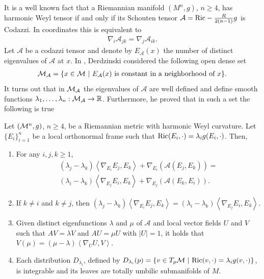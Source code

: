 It is a well known fact that a Riemannian manifold $(M^{n},g)$, $n\geq4$, has harmonic Weyl tensor if and only if its Schouten tensor $\mathcal{A}=\mathrm{Ric}-\frac{R}{2(n-1)}g$ is Codazzi. In coordinates this is equivalent to
\begin{align}
	\nabla_{i}\mathcal{A}_{jk}=\nabla_{j}\mathcal{A}_{ik}.
\end{align}
Let $\mathcal{A}$ be a codazzi tensor and denote by $E_{\mathcal{A}}(x)$ the number of distinct eigenvalues of $\mathcal{A}$ at $x$. In \cite{derd}, Derdzinski considered the following open dense set
\begin{align}
	\mathcal{M}_{\mathcal{A}}=\{x\in \mathcal{M} \ |  \ E_{\mathcal{A}}(x)\text{ is constant in a neighborhood of }x\}.
\end{align}
It turns out that in $\mathcal{M}_{\mathcal{A}}$ the eigenvalues of $\mathcal{A}$ are well defined and define smooth functions $\lambda_{1},\ldots,\lambda_{n}:\mathcal{M}_{\mathcal{A}}\rightarrow\mathbb{R}$. Furthermore, he proved that in such a set the following is true
\begin{lema}\label{derdlema}
	Let $(\mathcal{M}^n,g)$, $n\geq4$, be a Riemannian metric with harmonic Weyl curvature. Let $\{E_{i}\}_{i=1}^{n}$ be a local orthonormal frame such that $\mathrm{Ric}(E_{i},\cdot)=\lambda_{i}g(E_{i},\cdot)$. Then,
	\begin{enumerate}
		\item\label{derd1} For any $i,j,k\geq1$,
		\begin{align*}
		(\lambda_{j}-\lambda_{k})\left\langle\nabla_{E_{i}}E_{j},E_{k}\right\rangle+\nabla_{E_{i}}(\mathcal{A}(E_{j},E_{k}))=\\
		(\lambda_{i}-\lambda_{k})\left\langle\nabla_{E_{j}}E_{i},E_{k}\right\rangle+\nabla_{E_{j}}(\mathcal{A}(E_{k},E_{i})).
		\end{align*}
		\item If $k\neq i$ and $k\neq j$, then $(\lambda_{j}-\lambda_{k})\left\langle\nabla_{E_{i}}E_{j},E_{k}\right\rangle=(\lambda_{i}-\lambda_{k})\left\langle\nabla_{E_{j}}E_{i},E_{k}\right\rangle$.
		\item Given distinct eigenfunctions $\lambda$ and $\mu$ of $\mathcal{A}$ and local vector fields $U$ and $V$ such that $AV=\lambda V$ and $AU=\mu U$ with $|U|=1$, it holds that $V(\mu)=(\mu-\lambda)\left\langle\nabla_{U}U,V\right\rangle$.
		\item Each distribution $D_{\lambda_{i}}$, defined by $D_{\lambda_{i}}(p)=\{v\in T_{p} \mathcal{M} \ | \ \mathrm{Ric}(v,\cdot)=\lambda_{i}g(v,\cdot)\}$, is integrable	 and its leaves are totally umbilic submanifolds of $M$.
	\end{enumerate}
\end{lema}


